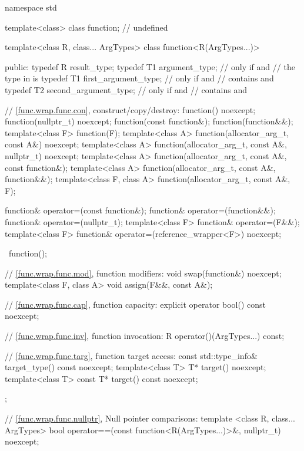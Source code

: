 \begin{codeblock}
namespace std {
  template<class> class function; // undefined

  template<class R, class... ArgTypes>
  class function<R(ArgTypes...)> {
  public:
    typedef R result_type;
    typedef T1 argument_type;           // only if  and
                                        // the type in  is 
    typedef T1 first_argument_type;     // only if  and
                                        //  contains  and 
    typedef T2 second_argument_type;    // only if  and
                                        //  contains  and 

    // \ref{func.wrap.func.con}, construct/copy/destroy:
    function() noexcept;
    function(nullptr_t) noexcept;
    function(const function&);
    function(function&&);
    template<class F> function(F);
    template<class A> function(allocator_arg_t, const A&) noexcept;
    template<class A> function(allocator_arg_t, const A&,
      nullptr_t) noexcept;
    template<class A> function(allocator_arg_t, const A&,
      const function&);
    template<class A> function(allocator_arg_t, const A&,
      function&&);
    template<class F, class A> function(allocator_arg_t, const A&, F);

    function& operator=(const function&);
    function& operator=(function&&);
    function& operator=(nullptr_t);
    template<class F> function& operator=(F&&);
    template<class F> function& operator=(reference_wrapper<F>) noexcept;

    ~function();

    // \ref{func.wrap.func.mod}, function modifiers:
    void swap(function&) noexcept;
    template<class F, class A> void assign(F&&, const A&);

    // \ref{func.wrap.func.cap}, function capacity:
    explicit operator bool() const noexcept;

    // \ref{func.wrap.func.inv}, function invocation:
    R operator()(ArgTypes...) const;

    // \ref{func.wrap.func.targ}, function target access:
    const std::type_info& target_type() const noexcept;
    template<class T>       T* target() noexcept;
    template<class T> const T* target() const noexcept;

  };

  // \ref{func.wrap.func.nullptr}, Null pointer comparisons:
  template <class R, class... ArgTypes>
    bool operator==(const function<R(ArgTypes...)>&, nullptr_t) noexcept;

}
\end{codeblock}
